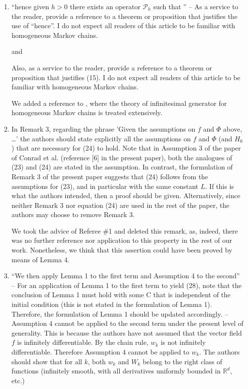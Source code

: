 \documentclass[10pt]{article}
\begin{document}
\begin{enumerate}
	\item 
	\begin{itquote}	
		{} ``hence given $h>0$ there exists an operator $\mathcal{P}_h$ such that '' -- As a service to the reader, provide a reference to a theorem or proposition that justifies the use of ``hence''. I do not expect all readers of this article to be familiar with homogeneous Markov chains.
	\end{itquote}
	and
	\begin{itquote}
		{} Also, as a service to the reader, provide a reference to a theorem or proposition that justifies (15). I do not expect all readers of this article to be familiar with homogeneous Markov chains.
	\end{itquote}
	We added a reference to \cite[Section 2.3]{Pav14}, where the theory of infinitesimal generator for homogeneous Markov chains is treated extensively.
	\item 
	\begin{itquote}
		 In Remark 3, regarding the phrase 'Given the assumptions on $f$ and $\Phi$ above, …' the authors should state explicitly all the assumptions on $f$ and $\Phi$ (and $H_0$) that are necessary for (24) to hold. Note that in Assumption 3 of the paper of Conrad et al. (reference [6] in the present paper), both the analogues of (23) and (24) are stated in the assumption. In contrast, the formulation of Remark 3 of the present paper suggests that (24) follows from the assumptions for (23), and in particular with the same constant $L$. If this is what the authors intended, then a proof should be given. Alternatively, since neither Remark 3 nor equation (24) are used in the rest of the paper, the authors may choose to remove Remark 3.
	\end{itquote}
	We took the advice of Referee \#1 and deleted this remark, as, indeed, there was no further reference nor application to this property in the rest of our work. Nonetheless, we think that this assertion could have been proved by means of Lemma 4. 
	\item 
	\begin{itquote}{} ``We then apply Lemma 1 to the first term and Assumption 4 to the second'' -- For an application of Lemma 1 to the first term to yield (28), note that the conclusion of Lemma 1 must hold with some C that is independent of the initial condition (this is not stated in the formulation of Lemma 1). Therefore, the formulation of Lemma 1 should be updated accordingly. -- Assumption 4 cannot be applied to the second term under the present level of generality. This is because the authors have not assumed that the vector field $f$ is infinitely differentiable. By the chain rule, $w_k$ is not infinitely differentiable. Therefore Assumption 4 cannot be applied to $w_k$. The authors should show that for all $k$, both $w_k$ and $W_k$ belong to the right class of functions (infinitely smooth, with all derivatives uniformly bounded in $\mathbb{R}^d$, etc.)

\end{itquote}
\end{enumerate}
\end{document}
